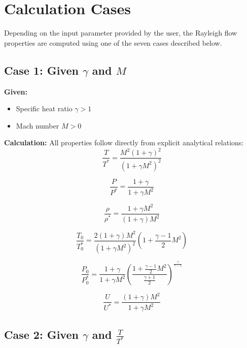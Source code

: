 \section{Calculation Cases}

Depending on the input parameter provided by the user, the Rayleigh flow properties are computed using one of the seven cases described below.

\subsection*{Case 1: Given $\gamma$ and $M$}

\textbf{Given:}
\begin{itemize}[nosep]
    \item Specific heat ratio $\gamma > 1$
    \item Mach number $M > 0$
\end{itemize}

\textbf{Calculation:} All properties follow directly from explicit analytical relations:
\begin{equation}
\frac{T}{T^*} = \frac{M^2(1+\gamma)^2}{(1+\gamma M^2)^2}
\end{equation}

\begin{equation}
\frac{P}{P^*} = \frac{1+\gamma}{1+\gamma M^2}
\end{equation}

\begin{equation}
\frac{\rho}{\rho^*} = \frac{1+\gamma M^2}{(1+\gamma)M^2}
\end{equation}

\begin{equation}
\frac{T_0}{T_0^*} = \frac{2(1+\gamma)M^2}{(1+\gamma M^2)^2}\left(1+\frac{\gamma-1}{2}M^2\right)
\end{equation}

\begin{equation}
\frac{P_0}{P_0^*} = \frac{1+\gamma}{1+\gamma M^2}\left(\frac{1+\frac{\gamma-1}{2}M^2}{\frac{\gamma+1}{2}}\right)^{\frac{\gamma}{\gamma-1}}
\end{equation}

\begin{equation}
\frac{U}{U^*} = \frac{(1+\gamma)M^2}{1+\gamma M^2}
\end{equation}


\subsection*{Case 2: Given $\gamma$ and $\frac{T}{T^*}$}

